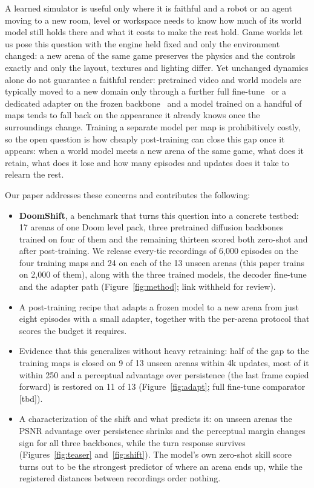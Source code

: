 \documentclass{article}
\newif\ifdraftmarks \draftmarkstrue
\newcommand{\tbd}{\ifdraftmarks\textcolor[rgb]{0,0.3,0.75}{[tbd]}\else[tbd]\fi}
\newcommand{\prov}[1]{\ifdraftmarks\textcolor[rgb]{0,0.3,0.75}{#1}\else#1\fi}
\begin{document}
A learned simulator is useful only where it is faithful and a robot or an agent moving to a new room, level or workspace needs to know how much of its world model still holds there and what it costs to make the rest hold.
Game worlds let us pose this question with the engine held fixed and only the environment changed: a new arena of the same game preserves the physics and the controls exactly and only the layout, textures and lighting differ.
Yet unchanged dynamics alone do not guarantee a faithful render: pretrained video and world models are typically moved to a new domain only through a further full fine-tune~\citep{gao2025adaworld} or a dedicated adapter on the frozen backbone~\citep{rigter2024avid} and a model trained on a handful of maps tends to fall back on the appearance it already knows once the surroundings change.
Training a separate model per map is prohibitively costly, so the open question is how cheaply post-training can close this gap once it appears: when a world model meets a new arena of the same game, what does it retain, what does it lose and how many episodes and updates does it take to relearn the rest.

Our paper addresses these concerns and contributes the following:
\begin{itemize}\setlength{\itemsep}{0pt}
\item \textbf{DoomShift}, a benchmark that turns this question into a concrete testbed: 17 arenas of one Doom level pack, three pretrained diffusion backbones trained on four of them and the remaining thirteen scored both zero-shot and after post-training. We release every-tic recordings of \prov{6,000} episodes on the four training maps and 24 on each of the 13 unseen arenas (this paper trains on 2,000 of them), along with the three trained models, the decoder fine-tune and the adapter path (Figure~\ref{fig:method}; link withheld for review).
\item A post-training recipe that adapts a frozen model to a new arena from just eight episodes with a small adapter, together with the per-arena protocol that scores the budget it requires.
\item Evidence that this generalizes without heavy retraining: half of the gap to the training maps is closed on 9 of 13 unseen arenas within 4k updates, most of it within 250 and a perceptual advantage over persistence (the last frame copied forward) is restored on 11 of 13 (Figure~\ref{fig:adapt}; full fine-tune comparator \tbd{}).
\item A characterization of the shift and what predicts it: on unseen arenas the PSNR advantage over persistence shrinks and the perceptual margin changes sign for all three backbones, while the turn response survives (Figures~\ref{fig:teaser} and~\ref{fig:shift}). The model's own zero-shot skill score turns out to be the strongest predictor of where an arena ends up, while the registered distances between recordings order nothing.
\end{itemize}
\end{document}
